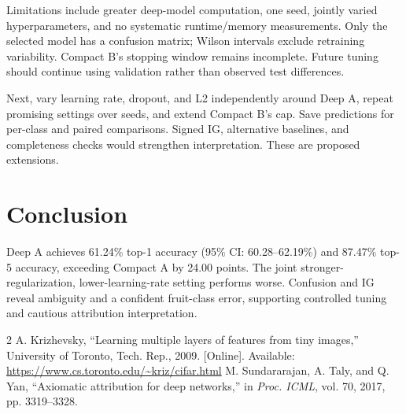 \documentclass[conference]{IEEEtran}
\begin{document}
Limitations include greater deep-model computation, one seed, jointly varied hyperparameters, and no systematic runtime/memory measurements. Only the selected model has a confusion matrix; Wilson intervals exclude retraining variability. Compact B's stopping window remains incomplete. Future tuning should continue using validation rather than observed test differences.

Next, vary learning rate, dropout, and L2 independently around Deep A, repeat promising settings over seeds, and extend Compact B's cap. Save predictions for per-class and paired comparisons. Signed IG, alternative baselines, and completeness checks would strengthen interpretation. These are proposed extensions.

\section{Conclusion}
Deep A achieves 61.24\% top-1 accuracy (95\% CI: 60.28--62.19\%) and 87.47\% top-5 accuracy, exceeding Compact A by 24.00 points. The joint stronger-regularization, lower-learning-rate setting performs worse. Confusion and IG reveal ambiguity and a confident fruit-class error, supporting controlled tuning and cautious attribution interpretation.

\begin{thebibliography}{2}
 A. Krizhevsky, ``Learning multiple layers of features from tiny images,'' University of Toronto, Tech. Rep., 2009. [Online]. Available: \url{https://www.cs.toronto.edu/~kriz/cifar.html}
 M. Sundararajan, A. Taly, and Q. Yan, ``Axiomatic attribution for deep networks,'' in \emph{Proc. ICML}, vol. 70, 2017, pp. 3319--3328.
\end{thebibliography}
\end{document}
